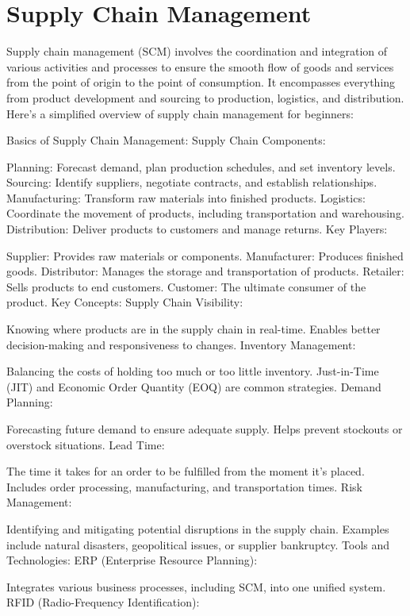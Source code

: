 % 
\section{Supply Chain Management}
\label{relatedknowledge:Supply Chain Management}
% 
Supply chain management (SCM) involves the coordination and integration of various activities and processes to ensure the smooth flow of goods and services from the point of origin to the point of consumption. It encompasses everything from product development and sourcing to production, logistics, and distribution. Here's a simplified overview of supply chain management for beginners:

Basics of Supply Chain Management:
Supply Chain Components:

Planning: Forecast demand, plan production schedules, and set inventory levels.
Sourcing: Identify suppliers, negotiate contracts, and establish relationships.
Manufacturing: Transform raw materials into finished products.
Logistics: Coordinate the movement of products, including transportation and warehousing.
Distribution: Deliver products to customers and manage returns.
Key Players:

Supplier: Provides raw materials or components.
Manufacturer: Produces finished goods.
Distributor: Manages the storage and transportation of products.
Retailer: Sells products to end customers.
Customer: The ultimate consumer of the product.
Key Concepts:
Supply Chain Visibility:

Knowing where products are in the supply chain in real-time.
Enables better decision-making and responsiveness to changes.
Inventory Management:

Balancing the costs of holding too much or too little inventory.
Just-in-Time (JIT) and Economic Order Quantity (EOQ) are common strategies.
Demand Planning:

Forecasting future demand to ensure adequate supply.
Helps prevent stockouts or overstock situations.
Lead Time:

The time it takes for an order to be fulfilled from the moment it's placed.
Includes order processing, manufacturing, and transportation times.
Risk Management:

Identifying and mitigating potential disruptions in the supply chain.
Examples include natural disasters, geopolitical issues, or supplier bankruptcy.
Tools and Technologies:
ERP (Enterprise Resource Planning):

Integrates various business processes, including SCM, into one unified system.
RFID (Radio-Frequency Identification):

